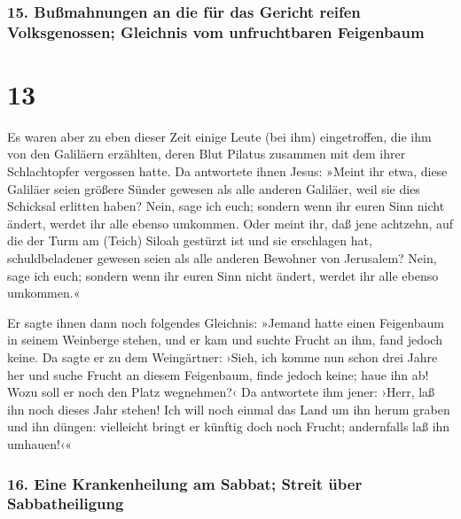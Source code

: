 \hypertarget{buuxdfmahnungen-an-die-fuxfcr-das-gericht-reifen-volksgenossen-gleichnis-vom-unfruchtbaren-feigenbaum}{%
\subsubsection{15. Bußmahnungen an die für das Gericht reifen
Volksgenossen; Gleichnis vom unfruchtbaren
Feigenbaum}\label{buuxdfmahnungen-an-die-fuxfcr-das-gericht-reifen-volksgenossen-gleichnis-vom-unfruchtbaren-feigenbaum}}

\hypertarget{section-12}{%
\section{13}\label{section-12}}

 Es waren aber zu eben dieser Zeit einige Leute (bei ihm)
eingetroffen, die ihm von den Galiläern erzählten, deren Blut Pilatus
zusammen mit dem ihrer Schlachtopfer vergossen hatte.  Da
antwortete ihnen Jesus: »Meint ihr etwa, diese Galiläer seien größere
Sünder gewesen als alle anderen Galiläer, weil sie dies Schicksal
erlitten haben?  Nein, sage ich euch; sondern wenn ihr
euren Sinn nicht ändert, werdet ihr alle ebenso umkommen. 
Oder meint ihr, daß jene achtzehn, auf die der Turm am (Teich) Siloah
gestürzt ist und sie erschlagen hat, schuldbeladener gewesen seien als
alle anderen Bewohner von Jerusalem?  Nein, sage ich euch;
sondern wenn ihr euren Sinn nicht ändert, werdet ihr alle ebenso
umkommen.«

 Er sagte ihnen dann noch folgendes Gleichnis: »Jemand
hatte einen Feigenbaum in seinem Weinberge stehen, und er kam und suchte
Frucht an ihm, fand jedoch keine.  Da sagte er zu dem
Weingärtner: ›Sieh, ich komme nun schon drei Jahre her und suche Frucht
an diesem Feigenbaum, finde jedoch keine; haue ihn ab! Wozu soll er noch
den Platz wegnehmen?‹  Da antwortete ihm jener: ›Herr, laß
ihn noch dieses Jahr stehen! Ich will noch einmal das Land um ihn herum
graben und ihn düngen:  vielleicht bringt er künftig doch
noch Frucht; andernfalls laß ihn umhauen!‹«

\hypertarget{eine-krankenheilung-am-sabbat-streit-uxfcber-sabbatheiligung}{%
\subsubsection{16. Eine Krankenheilung am Sabbat; Streit über
Sabbatheiligung}\label{eine-krankenheilung-am-sabbat-streit-uxfcber-sabbatheiligung}}

